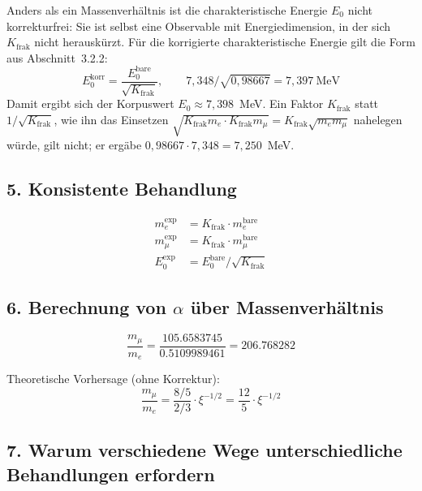 Anders als ein Massenverhältnis ist die charakteristische Energie $E_0$ nicht korrekturfrei: Sie ist selbst eine Observable mit Energiedimension, in der sich $K_{\text{frak}}$ nicht herauskürzt. Für die korrigierte charakteristische Energie gilt die Form aus Abschnitt~3.2.2:
\[
E_0^{\text{korr}} = \frac{E_0^{\text{bare}}}{\sqrt{K_{\text{frak}}}}, \qquad 7{,}348/\sqrt{0{,}98667} = 7{,}397~\text{MeV}
\]
Damit ergibt sich der Korpuswert $E_0 \approx 7{,}398$~MeV. Ein Faktor $K_{\text{frak}}$ statt $1/\sqrt{K_{\text{frak}}}$, wie ihn das Einsetzen $\sqrt{K_{\text{frak}} m_e \cdot K_{\text{frak}} m_\mu} = K_{\text{frak}}\sqrt{m_e m_\mu}$ nahelegen würde, gilt nicht; er ergäbe $0{,}98667\cdot7{,}348 = 7{,}250$~MeV.

\subsection{5. Konsistente Behandlung}

\begin{align*}
	m_e^{\text{exp}} &= K_{\text{frak}} \cdot m_e^{\text{bare}} \\
	m_\mu^{\text{exp}} &= K_{\text{frak}} \cdot m_\mu^{\text{bare}} \\
	E_0^{\text{exp}} &= E_0^{\text{bare}}/\sqrt{K_{\text{frak}}}
\end{align*}

\subsection{6. Berechnung von $\alpha$ über Massenverhältnis}

\[
\frac{m_\mu}{m_e} = \frac{105.6583745}{0.5109989461} = 206.768282
\]

Theoretische Vorhersage (ohne Korrektur):
\[
\frac{m_\mu}{m_e} = \frac{8/5}{2/3} \cdot \xi^{-1/2} = \frac{12}{5} \cdot \xi^{-1/2}
\]

\subsection{7. Warum verschiedene Wege unterschiedliche Behandlungen erfordern}


